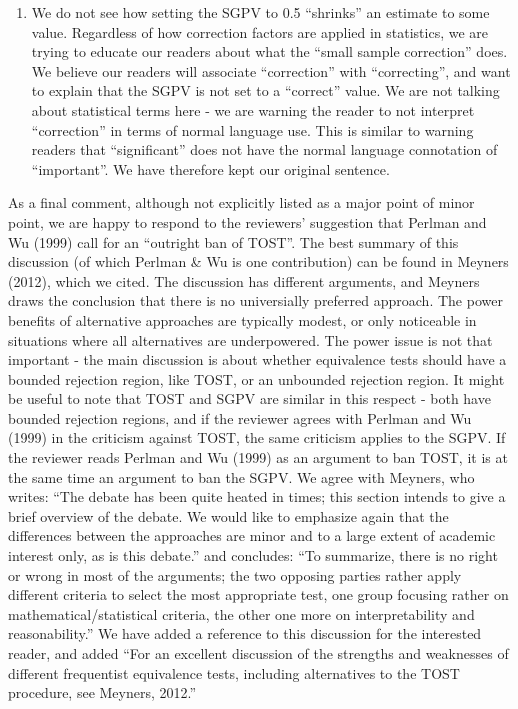 \documentclass[man]{apa6}
\providecommand{\tightlist}{%
  \setlength{\itemsep}{0pt}\setlength{\parskip}{0pt}}
\begin{document}
\begin{enumerate}
\def\labelenumi{\arabic{enumi}.}
\setcounter{enumi}{7}
\tightlist
\item
  We do not see how setting the SGPV to 0.5 \enquote{shrinks} an estimate to some value. Regardless of how correction factors are applied in statistics, we are trying to educate our readers about what the \enquote{small sample correction} does. We believe our readers will associate \enquote{correction} with \enquote{correcting}, and want to explain that the SGPV is not set to a \enquote{correct} value. We are not talking about statistical terms here - we are warning the reader to not interpret \enquote{correction} in terms of normal language use. This is similar to warning readers that \enquote{significant} does not have the normal language connotation of \enquote{important}. We have therefore kept our original sentence.
\end{enumerate}

As a final comment, although not explicitly listed as a major point of minor point, we are happy to respond to the reviewers' suggestion that Perlman and Wu (1999) call for an \enquote{outright ban of TOST}. The best summary of this discussion (of which Perlman \& Wu is one contribution) can be found in Meyners (2012), which we cited. The discussion has different arguments, and Meyners draws the conclusion that there is no universially preferred approach. The power benefits of alternative approaches are typically modest, or only noticeable in situations where all alternatives are underpowered. The power issue is not that important - the main discussion is about whether equivalence tests should have a bounded rejection region, like TOST, or an unbounded rejection region. It might be useful to note that TOST and SGPV are similar in this respect - both have bounded rejection regions, and if the reviewer agrees with Perlman and Wu (1999) in the criticism against TOST, the same criticism applies to the SGPV. If the reviewer reads Perlman and Wu (1999) as an argument to ban TOST, it is at the same time an argument to ban the SGPV. We agree with Meyners, who writes: \enquote{The debate has been quite heated in times; this section intends to give a brief overview of the debate. We would like to emphasize again that the differences between the approaches are minor and to a large extent of academic interest only, as is this debate.} and concludes: \enquote{To summarize, there is no right or wrong in most of the arguments; the two opposing parties rather apply different criteria to select the most appropriate test, one group focusing rather on mathematical/statistical criteria, the other one more on interpretability and reasonability.} We have added a reference to this discussion for the interested reader, and added \enquote{For an excellent discussion of the strengths and weaknesses of different frequentist equivalence tests, including alternatives to the TOST procedure, see Meyners, 2012.}
\end{document}
